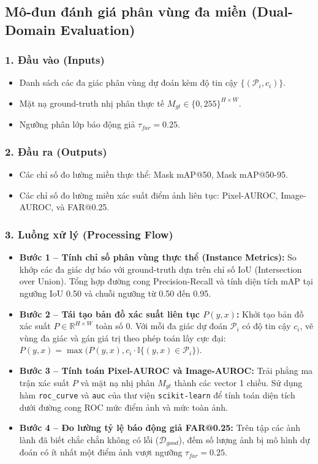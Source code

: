 \subsection{Mô-đun đánh giá phân vùng đa miền (Dual-Domain Evaluation)}

\subsubsection*{1. Đầu vào (Inputs)}
\begin{itemize}
    \item Danh sách các đa giác phân vùng dự đoán kèm độ tin cậy $\{(\mathcal{P}_i, c_i)\}$.
    \item Mặt nạ ground-truth nhị phân thực tế $M_{gt} \in \{0, 255\}^{H \times W}$.
    \item Ngưỡng phân lớp báo động giả $\tau_{far} = 0.25$.
\end{itemize}

\subsubsection*{2. Đầu ra (Outputs)}
\begin{itemize}
    \item Các chỉ số đo lường miền thực thể: Mask mAP@50, Mask mAP@50-95.
    \item Các chỉ số đo lường miền xác suất điểm ảnh liên tục: Pixel-AUROC, Image-AUROC, và FAR@0.25.
\end{itemize}

\subsubsection*{3. Luồng xử lý (Processing Flow)}
\begin{itemize}
    \item \textbf{Bước 1 -- Tính chỉ số phân vùng thực thể (Instance Metrics):} So khớp các đa giác dự báo với ground-truth dựa trên chỉ số IoU (Intersection over Union). Tổng hợp đường cong Precision-Recall và tính diện tích mAP tại ngưỡng IoU 0.50 và chuỗi ngưỡng từ 0.50 đến 0.95.
    \item \textbf{Bước 2 -- Tái tạo bản đồ xác suất liên tục $P(y, x)$:} Khởi tạo bản đồ xác suất $P \in \mathbb{R}^{H \times W}$ toàn số 0. Với mỗi đa giác dự đoán $\mathcal{P}_i$ có độ tin cậy $c_i$, vẽ vùng đa giác và gán giá trị theo phép toán lấy cực đại: $P(y, x) = \max\Big(P(y, x), c_i \cdot \mathbb{I}\{(y, x) \in \mathcal{P}_i\}\Big)$.
    \item \textbf{Bước 3 -- Tính toán Pixel-AUROC và Image-AUROC:} Trải phẳng ma trận xác suất $P$ và mặt nạ nhị phân $M_{gt}$ thành các vector 1 chiều. Sử dụng hàm \texttt{roc\_curve} và \texttt{auc} của thư viện \texttt{scikit-learn} để tính toán diện tích dưới đường cong ROC mức điểm ảnh và mức toàn ảnh.
    \item \textbf{Bước 4 -- Đo lường tỷ lệ báo động giả FAR@0.25:} Trên tập các ảnh lành đã biết chắc chắn không có lỗi ($\mathcal{D}_{good}$), đếm số lượng ảnh bị mô hình dự đoán có ít nhất một điểm ảnh vượt ngưỡng $\tau_{far} = 0.25$.
\end{itemize}

